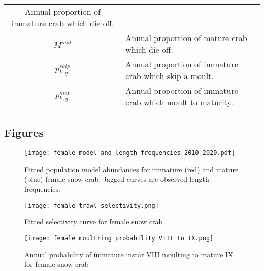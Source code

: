 \documentclass[
]{article}
\begin{document}
\begin{longtable}[]{@{}cl@{}}
\begin{minipage}[t]{0.74\columnwidth}
Annual proportion of immature crab which die off.\strut
\end{minipage}\tabularnewline
\begin{minipage}[t]{0.20\columnwidth}\centering
\(M^{mat}\)\strut
\end{minipage} & \begin{minipage}[t]{0.74\columnwidth}\raggedright
Annual proportion of mature crab which die off.\strut
\end{minipage}\tabularnewline
\begin{minipage}[t]{0.20\columnwidth}\centering
\(p_{k,y}^{skip}\)\strut
\end{minipage} & \begin{minipage}[t]{0.74\columnwidth}\raggedright
Annual proportion of immature crab which skip a moult.\strut
\end{minipage}\tabularnewline
\begin{minipage}[t]{0.20\columnwidth}\centering
\(p_{k,y}^{mat}\)\strut
\end{minipage} & \begin{minipage}[t]{0.74\columnwidth}\raggedright
Annual proportion of immature crab which moult to maturity.\strut
\end{minipage}\tabularnewline
\bottomrule
\end{longtable}

\newpage

\hypertarget{figures}{%
\subsection{Figures}\label{figures}}

\begin{figure}
\centering
\texttt{[image: female model and length-frequencies 2010-2020.pdf]}
\caption{Fitted population model abundances for immature (red) and
mature (blue) female snow crab. Jagged curves are observed
length-frequencies.}
\end{figure}

\begin{figure}
\centering
\texttt{[image: female trawl selectivity.png]}
\caption{Fitted selectivity curve for female snow crab}
\end{figure}

\begin{figure}
\centering
\texttt{[image: female moultring probability VIII to IX.png]}
\caption{Annual probability of immature instar VIII moulting to mature
IX for female snow crab}
\end{figure}
\end{document}

